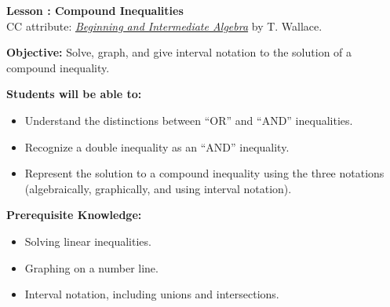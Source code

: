 \documentclass[12pt]{article}
\theoremstyle{definition}
\begin{document}
{\bf \large Lesson : Compound Inequalities}\label{les:compound_inequalities}
\\ CC attribute: \href{http://www.wallace.ccfaculty.org/book/book.html}{\it{Beginning and Intermediate Algebra}} by T. Wallace. 
\hfill \doclicenseImage[imagewidth=5em]\\
\par
{\bf Objective:} Solve, graph, and give interval notation to the solution
of a compound inequality.\\
\par
{\bf Students will be able to:}
\begin{itemize}
	\item Understand the distinctions between ``OR'' and ``AND'' inequalities.
	\item Recognize a double inequality as an ``AND'' inequality.
	\item Represent the solution to a compound inequality using the three notations (algebraically, graphically, and using interval notation).
\end{itemize}
{\bf Prerequisite Knowledge:}
\begin{itemize}
	\item Solving linear inequalities.
	\item Graphing on a number line.
	\item Interval notation, including unions and intersections.
\end{itemize}
\hrulefill
\end{document}

